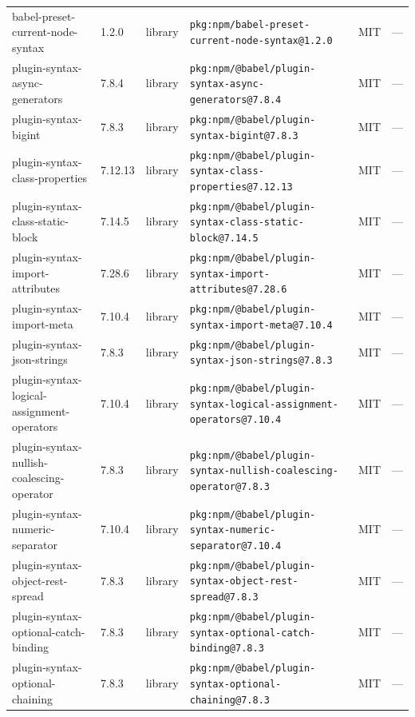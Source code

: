 \documentclass[11pt,a4paper]{article}
\begin{document}
\begin{longtable}{|p{4cm}|p{2cm}|p{1.6cm}|p{5cm}|p{1.5cm}|p{3.5cm}|}
\raggedright babel-preset-current-node-syntax & 1.2.0 & library & \small\texttt{pkg:npm/babel-preset-current-node-syntax@1.2.0} & MIT & \small — \\
\raggedright plugin-syntax-async-generators & 7.8.4 & library & \small\texttt{pkg:npm/@babel/plugin-syntax-async-generators@7.8.4} & MIT & \small — \\
\raggedright plugin-syntax-bigint & 7.8.3 & library & \small\texttt{pkg:npm/@babel/plugin-syntax-bigint@7.8.3} & MIT & \small — \\
\raggedright plugin-syntax-class-properties & 7.12.13 & library & \small\texttt{pkg:npm/@babel/plugin-syntax-class-properties@7.12.13} & MIT & \small — \\
\raggedright plugin-syntax-class-static-block & 7.14.5 & library & \small\texttt{pkg:npm/@babel/plugin-syntax-class-static-block@7.14.5} & MIT & \small — \\
\raggedright plugin-syntax-import-attributes & 7.28.6 & library & \small\texttt{pkg:npm/@babel/plugin-syntax-import-attributes@7.28.6} & MIT & \small — \\
\raggedright plugin-syntax-import-meta & 7.10.4 & library & \small\texttt{pkg:npm/@babel/plugin-syntax-import-meta@7.10.4} & MIT & \small — \\
\raggedright plugin-syntax-json-strings & 7.8.3 & library & \small\texttt{pkg:npm/@babel/plugin-syntax-json-strings@7.8.3} & MIT & \small — \\
\raggedright plugin-syntax-logical-assignment-operators & 7.10.4 & library & \small\texttt{pkg:npm/@babel/plugin-syntax-logical-assignment-operators@7.10.4} & MIT & \small — \\
\raggedright plugin-syntax-nullish-coalescing-operator & 7.8.3 & library & \small\texttt{pkg:npm/@babel/plugin-syntax-nullish-coalescing-operator@7.8.3} & MIT & \small — \\
\raggedright plugin-syntax-numeric-separator & 7.10.4 & library & \small\texttt{pkg:npm/@babel/plugin-syntax-numeric-separator@7.10.4} & MIT & \small — \\
\raggedright plugin-syntax-object-rest-spread & 7.8.3 & library & \small\texttt{pkg:npm/@babel/plugin-syntax-object-rest-spread@7.8.3} & MIT & \small — \\
\raggedright plugin-syntax-optional-catch-binding & 7.8.3 & library & \small\texttt{pkg:npm/@babel/plugin-syntax-optional-catch-binding@7.8.3} & MIT & \small — \\
\raggedright plugin-syntax-optional-chaining & 7.8.3 & library & \small\texttt{pkg:npm/@babel/plugin-syntax-optional-chaining@7.8.3} & MIT & \small — \\

\end{longtable}
\end{document}
